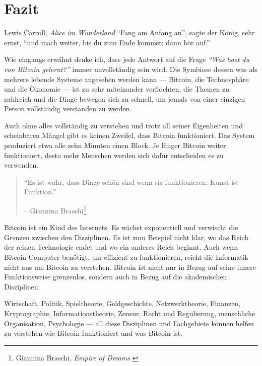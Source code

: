 \label{ch:conclusion}

\chapter*{Fazit}

\begin{chapquote}{Lewis Carroll, \textit{Alice im Wunderland}}
\enquote{Fang am Anfang an}, sagte der König, sehr ernst, \enquote{und mach
weiter, bis du zum Ende kommst: dann hör auf.}
\end{chapquote}

Wie eingangs erwähnt denke ich, dass jede Antwort auf die Frage
\textit{\enquote{Was hast du von Bitcoin gelernt?}} immer unvollständig sein
wird. Die Symbiose dessen was als mehrere lebende Systeme angesehen werden kann
--- Bitcoin, die Technosphäre und die Ökonomie --- ist zu sehr miteinander
verflochten, die Themen zu zahlreich und die Dinge bewegen sich zu schnell, um
jemals von einer einzigen Person vollständig verstanden zu werden.

Auch ohne alles vollständig zu verstehen und trotz all seiner Eigenheiten und
scheinbaren Mängel gibt es keinen Zweifel, dass Bitcoin funktioniert. Das System
produziert etwa alle zehn Minuten einen Block. Je länger Bitcoin weiter
funktioniert, desto mehr Menschen werden sich dafür entscheiden es zu verwenden.

\begin{quotation}\begin{samepage}
\enquote{Es ist wahr, dass Dinge schön sind wenn sie funktionieren.
Kunst ist Funktion.}
\begin{flushright} -- Giannina Braschi\footnote{Giannina Braschi, \textit{Empire of Dreams} \cite{braschi2011empire}}
\end{flushright}\end{samepage}\end{quotation}

Bitcoin ist ein Kind des Internets. Es wächst exponentiell und
verwischt die Grenzen zwischen den Disziplinen. Es ist zum Beispiel nicht klar,
wo das Reich der reinen Technologie endet und wo ein anderes Reich beginnt. Auch
wenn Bitcoin Computer benötigt, um effizient zu funktionieren, reicht die
Informatik nicht aus um Bitcoin zu verstehen. Bitcoin ist nicht nur in Bezug auf
seine innere Funktionsweise grenzenlos, sondern auch in Bezug auf die
akademischen Disziplinen.

Wirtschaft, Politik, Spieltheorie, Geldgeschichte, Netzwerktheorie, Finanzen,
Kryptographie, Informationstheorie, Zensur, Recht und Regulierung, menschliche
Organisation, Psychologie --- all diese Disziplinen und Fachgebiete können
helfen zu verstehen wie Bitcoin funktioniert und was Bitcoin ist.

